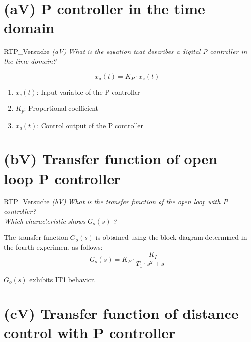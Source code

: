 \documentclass[12pt, oneside, a4paper]{scrreprt}
\begin{document}
        \section{(aV)  P controller in the time domain}\label{sec:a-p-controller-time-domain}

            \begin{displaycquote}{RTP_Versuche}
                \footnotesize{\textit{(aV) What is the equation that describes a digital P controller in the time domain?}}
            \end{displaycquote}\label{task(aV)}

            \begin{equation}
                x_a(t) = K_P \cdot x_e(t)
            \end{equation}

            \begin{enumerate}
                \item $x_e(t)$: Input variable of the P controller
                \item $K_p$: Proportional coefficient
                \item $x_a(t)$: Control output of the P controller
            \end{enumerate}


        \section{(bV) Transfer function of open loop P controller}\label{sec:b-transfer-function-open-loop-p-controller}
            
            \begin{displaycquote}{RTP_Versuche}
                \footnotesize{\textit{(bV) What is the transfer function of the open loop with P controller?\\
                Which characteristic shows $G_o(s)$ ?}}
            \end{displaycquote}\label{task(bV)}

            The transfer function $G_o(s)$ is obtained using the block diagram determined in the fourth experiment as follows:
            \begin{equation}
                G_o(s) = K_P\cdot \frac{-K_I}	{T_1\cdot s^2 + s }
            \end{equation}\label{eq:G_o(s)}

            $G_o(s)$ exhibits IT1 behavior.

        \section{(cV) Transfer function of distance control with P controller}\label{sec:c-transfer-function-distance-control-p-controller}
\end{document}
